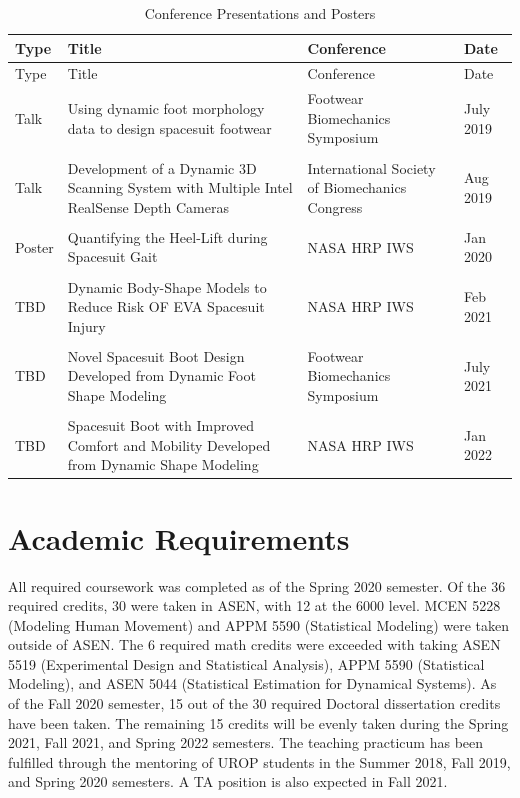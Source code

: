 \documentclass[defaultstyle,11pt]{thesis}
\begin{document}
\hypertarget{tbl:conf}{}
\begin{longtable}[]{@{}
  >{\raggedright\arraybackslash}p{}
  >{\raggedright\arraybackslash}p{}
  >{\raggedright\arraybackslash}p{}
  >{\raggedright\arraybackslash}p{}@{}}
\caption{\label{tbl:conf}Conference Presentations and Posters}\tabularnewline
\toprule
Type & Title & Conference & Date \\
\midrule
\endfirsthead
\toprule
Type & Title & Conference & Date \\
\midrule
\endhead
Talk & Using dynamic foot morphology data to design spacesuit footwear & Footwear Biomechanics Symposium & July 2019 \\
& & & \\
Talk & Development of a Dynamic 3D Scanning System with Multiple Intel RealSense Depth Cameras & International Society of Biomechanics Congress & Aug 2019 \\
& & & \\
Poster & Quantifying the Heel-Lift during Spacesuit Gait & NASA HRP IWS & Jan 2020 \\
& & & \\
TBD & Dynamic Body-Shape Models to Reduce Risk OF EVA Spacesuit Injury & NASA HRP IWS & Feb 2021 \\
& & & \\
TBD & Novel Spacesuit Boot Design Developed from Dynamic Foot Shape Modeling & Footwear Biomechanics Symposium & July 2021 \\
& & & \\
TBD & Spacesuit Boot with Improved Comfort and Mobility Developed from Dynamic Shape Modeling & NASA HRP IWS & Jan 2022 \\
\bottomrule
\end{longtable}

\hypertarget{academic-requirements}{%
\section{Academic Requirements}\label{academic-requirements}}

All required coursework was completed as of the Spring 2020 semester. Of the 36 required credits, 30 were taken in ASEN, with 12 at the 6000 level. MCEN 5228 (Modeling Human Movement) and APPM 5590 (Statistical Modeling) were taken outside of ASEN. The 6 required math credits were exceeded with taking ASEN 5519 (Experimental Design and Statistical Analysis), APPM 5590 (Statistical Modeling), and ASEN 5044 (Statistical Estimation for Dynamical Systems). As of the Fall 2020 semester, 15 out of the 30 required Doctoral dissertation credits have been taken. The remaining 15 credits will be evenly taken during the Spring 2021, Fall 2021, and Spring 2022 semesters. The teaching practicum has been fulfilled through the mentoring of UROP students in the Summer 2018, Fall 2019, and Spring 2020 semesters. A TA position is also expected in Fall 2021.
\end{document}
